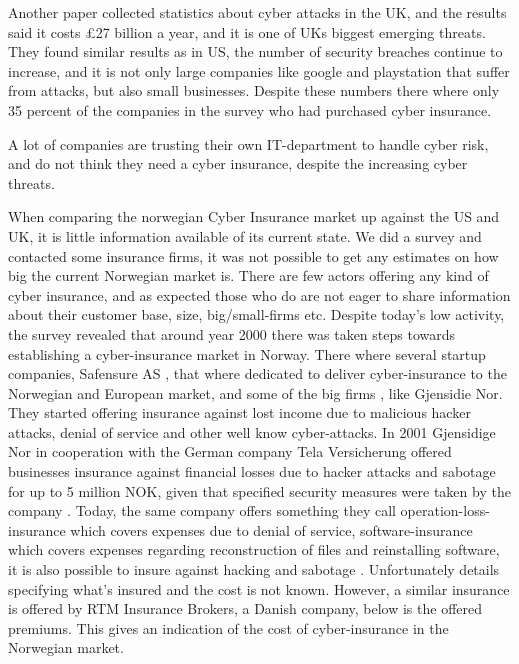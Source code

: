 Another paper \cite{evolvingcyber} collected statistics about cyber attacks in the UK, and the results said it costs \pounds 27
 billion a year, and it is one of UKs biggest emerging threats. They found similar results as in US,
  the number of security breaches continue to increase, and it is not only large companies like google
   and playstation that suffer from attacks, but also small businesses. Despite these numbers
    there where only 35 percent of the companies in the survey who had purchased cyber insurance. 

A lot of companies are trusting their own IT-department to handle cyber risk, 
and do not think they need a cyber insurance, despite the increasing cyber threats. \cite{twatson}


When comparing the norwegian Cyber Insurance market up against the US and UK, 
it is little information available of its current state. We did a survey and contacted some insurance firms,
it was not possible to get any estimates on how big the current Norwegian market is. 
There are few actors offering any kind of cyber insurance, and as expected those who do are not eager to share information about their customer base, size, big/small-firms etc. 
Despite today's low activity, the survey revealed that around year 2000 there was taken steps towards
 establishing a cyber-insurance market in Norway. There where several startup companies, Safensure AS \cite{digi},
  that where dedicated to deliver cyber-insurance to the Norwegian and European market, and some of
   the big firms , like Gjensidie Nor.
They started offering insurance against lost income due to malicious hacker attacks, denial of service and other well know cyber-attacks. 
In 2001 Gjensidige Nor in cooperation with the German company Tela Versicherung offered businesses
 insurance against financial losses due to hacker attacks and sabotage for up to 5 million NOK, given that specified security measures were taken by the company \cite{dagensithackerforsikring}. 
 Today, the same company 
offers something they call operation-loss-insurance which covers expenses due to denial of service,
 software-insurance which covers expenses regarding reconstruction of files and reinstalling software,
 it is also possible to insure against hacking and sabotage \citep{gjensidige}. 
 Unfortunately details specifying what's insured and the cost is not known. However,
  a similar insurance is offered by RTM Insurance Brokers, a Danish company, below is the offered premiums. This gives an indication of the cost of cyber-insurance in the Norwegian market. \cite{RTM}


